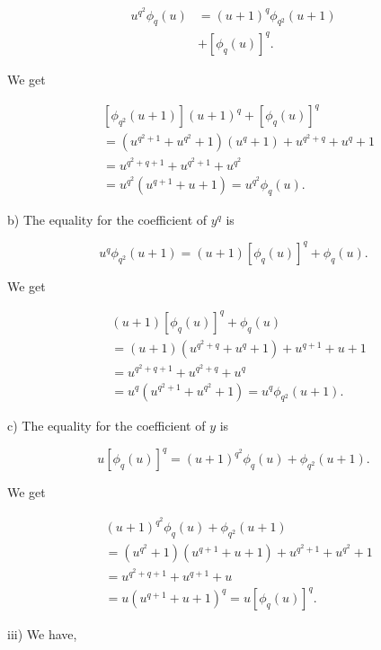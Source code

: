 \documentclass[10pt]{article}
\begin{document}
$$
\begin{aligned}
u^{q^{2}} \phi_{q}(u) & =(u+1)^{q} \phi_{q^{2}}(u+1) \\
& +\left[\phi_{q}(u)\right]^{q} .
\end{aligned}
$$

We get

$$
\begin{aligned}
& {\left[\phi_{q^{2}}(u+1)\right](u+1)^{q}+\left[\phi_{q}(u)\right]^{q}} \\
& =\left(u^{q^{2}+1}+u^{q^{2}}+1\right)\left(u^{q}+1\right)+u^{q^{2}+q}+u^{q}+1 \\
& =u^{q^{2}+q+1}+u^{q^{2}+1}+u^{q^{2}} \\
& =u^{q^{2}}\left(u^{q+1}+u+1\right)=u^{q^{2}} \phi_{q}(u) .
\end{aligned}
$$

b) The equality for the coefficient of $y^{q}$ is

$$
u^{q} \phi_{q^{2}}(u+1)=(u+1)\left[\phi_{q}(u)\right]^{q}+\phi_{q}(u) .
$$

We get

$$
\begin{aligned}
& (u+1)\left[\phi_{q}(u)\right]^{q}+\phi_{q}(u) \\
& =(u+1)\left(u^{q^{2}+q}+u^{q}+1\right)+u^{q+1}+u+1 \\
& =u^{q^{2}+q+1}+u^{q^{2}+q}+u^{q} \\
& =u^{q}\left(u^{q^{2}+1}+u^{q^{2}}+1\right)=u^{q} \phi_{q^{2}}(u+1) .
\end{aligned}
$$

c) The equality for the coefficient of $y$ is

$$
u\left[\phi_{q}(u)\right]^{q}=(u+1)^{q^{2}} \phi_{q}(u)+\phi_{q^{2}}(u+1) .
$$

We get

$$
\begin{aligned}
& (u+1)^{q^{2}} \phi_{q}(u)+\phi_{q^{2}}(u+1) \\
& =\left(u^{q^{2}}+1\right)\left(u^{q+1}+u+1\right)+u^{q^{2}+1}+u^{q^{2}}+1 \\
& =u^{q^{2}+q+1}+u^{q+1}+u \\
& =u\left(u^{q+1}+u+1\right)^{q}=u\left[\phi_{q}(u)\right]^{q} .
\end{aligned}
$$

iii) We have,
\end{document}
